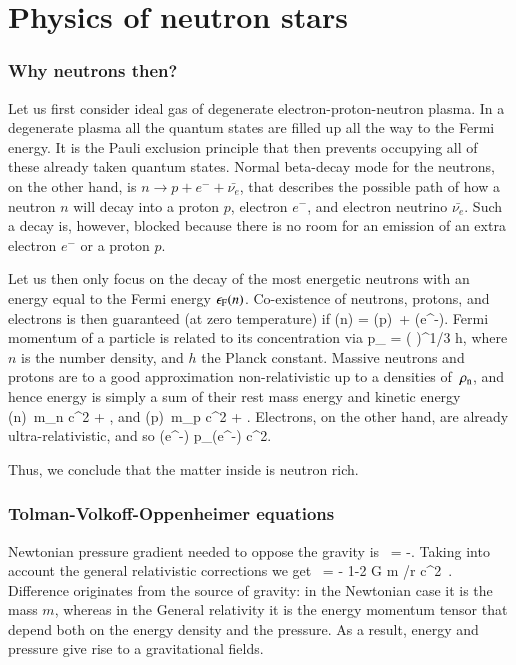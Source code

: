 \chapter{Physics of neutron stars} 


\subsection{Why neutrons then?}
Let us first consider ideal gas of degenerate electron-proton-neutron plasma.
In a degenerate plasma all the quantum states are filled up all the way to the Fermi energy.
It is the Pauli exclusion principle that then prevents occupying all of these already taken quantum states.
Normal beta-decay mode for the neutrons, on the other hand, is $n \rightarrow p + e^{-} + \bar{\nu_{e}}$, that describes the possible path of how a neutron $n$ will decay into a proton $p$, electron $e^{-}$, and electron neutrino $\bar{\nu_{e}}$.
Such a decay is, however, blocked because there is no room for an emission of an extra electron $e^{-}$ or a proton $p$.\cite[see e.g.][]{Phillips94}

Let us then only focus on the decay of the most energetic neutrons with an energy equal to the Fermi energy $\epsilon_{\mathrm{F}} (n)$.
Co-existence of neutrons, protons, and electrons is then guaranteed (at zero temperature) if 
\be
\ef(n) = \ef(p) + \ef(e^{-}).
\ee
Fermi momentum of a particle is related to its concentration via
\be
p_{} = \left(  \right)^{1/3} h,
\ee
where $n$ is the number density, and $h$ the Planck constant.
Massive neutrons and protons are to a good approximation non-relativistic up to a densities of $\, \rho_{\mathrm{n}} $, and hence energy is simply a sum of their rest mass energy and kinetic energy
\be
\ef(n) \approx m_n c^2 + ,
\ee
and
\be
\ef(p) \approx m_p c^2 + .
\ee
Electrons, on the other hand, are already ultra-relativistic, and so
\be
\ef(e^{-}) \approx p_{}(e^{-}) c^2.
\ee

Thus, we conclude that the matter inside is neutron rich.



\subsection{Tolman-Volkoff-Oppenheimer equations}
Newtonian pressure gradient needed to oppose the gravity is
\be
{} = -.
\ee
Taking into account the general relativistic corrections we get
\be
{} = 
    - \times 
    {1-2 G m /r c^2 }.
\ee
Difference originates from the source of gravity:
in the Newtonian case it is the mass $m$, whereas in the General relativity it is the energy momentum tensor that depend both on the energy density and the pressure.
As a result, energy and pressure give rise to a gravitational fields.

